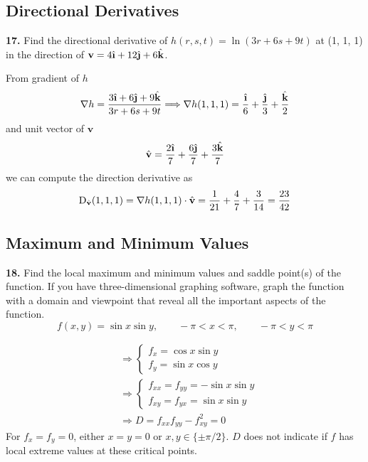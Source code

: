 \documentclass[a4paper,12pt]{article}
\newcommand{\unit}[1]{\hat{\textbf #1}}
\newcommand{\exercise}[1]{\noindent\textbf{#1.}}
\begin{document}
\setcounter{subsection}{5}
\subsection{Directional Derivatives}
\exercise{17} Find the directional derivative of $h(r,s,t) = \ln(3r + 6s + 9t)$
at (1, 1, 1) in the direction of $\mathbf v = 4\unit\i + 12\unit\j + 6\unit k$.

From gradient of $h$
\[\nabla h = \frac{3\unit\i + 6\unit\j + 9\unit k}{3r + 6s + 9t}
\Longrightarrow \nabla h(1, 1, 1)
= \frac{\unit\i}{6} + \frac{\unit\j}{3} + \frac{\unit k}{2}\]
and unit vector of $\mathbf v$
\[\unit v = \frac{2\unit\i}{7} + \frac{6\unit\j}{7} + \frac{3\unit k}{7}\]
we can compute the direction derivative as
\[\mathrm D_{\unit v}(1, 1, 1) = \nabla h(1, 1, 1)\cdot\unit v
= \frac{1}{21} + \frac{4}{7} + \frac{3}{14} = \frac{23}{42}\]

\subsection{Maximum and Minimum Values}
\exercise{18} Find the local maximum and minimum values and
saddle point(s) of the function. If you have three-dimensional
graphing software, graph the function with a domain and viewpoint
that reveal all the important aspects of the function.
\[f(x, y) = \sin x\sin y,\qquad -\pi < x < \pi,\qquad -\pi < y < \pi\]

\begin{multicols}{2}
  \begin{align*}
    &\Longrightarrow\begin{cases}
      f_x = \cos x\sin y\\
      f_y = \sin x\cos y
    \end{cases}\\
    &\Longrightarrow\begin{cases}
      f_{xx} = f_{yy} = -\sin x\sin y\\
      f_{xy} = f_{yx} = \sin x\sin y
    \end{cases}\\
    &\Longrightarrow D = f_{xx}f_{yy} - f_{xy}^2 = 0
  \end{align*}
  For $f_x = f_y = 0$, either $x = y = 0$ or $x, y \in \{\pm\pi/2\}$.
  $D$ does not indicate if $f$ has local extreme values
  at these critical points.

  \noindent{}
\end{multicols}
\end{document}
